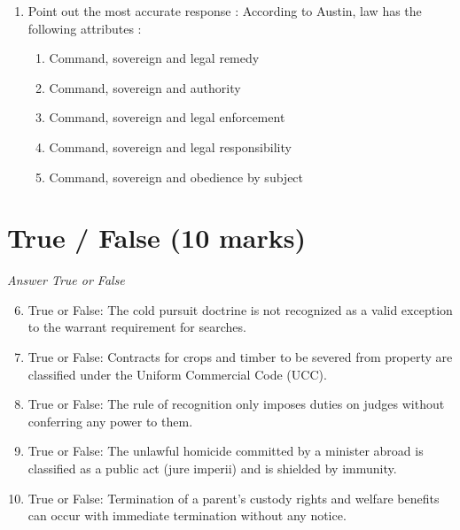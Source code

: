 \documentclass[12pt]{article}
\begin{document}
\begin{enumerate}[label=\arabic*.]
\begin{enumerate}[label=(\alph*)]
    \item The Nazi law in question was validly enacted.
    \item The Nazi rule of recognition was unclear.
    \item Hart agreed with Fuller's argument.
    \item The court misunderstood the legislation.
    \item Fuller misconstrued the purpose of the law.
\end{enumerate}
\item Point out the most accurate response : According to Austin, law has the following attributes :
\begin{enumerate}[label=(\alph*)]
    \item Command, sovereign and legal remedy
    \item Command, sovereign and authority
    \item Command, sovereign and legal enforcement
    \item Command, sovereign and legal responsibility
    \item Command, sovereign and obedience by subject
\end{enumerate}
\end{enumerate}

\section*{True / False (10 marks)}
\textit{Answer True or False}
\begin{enumerate}[label=\arabic*.]
\setcounter{enumi}{5}
\item True or False: The cold pursuit doctrine is not recognized as a valid exception to the warrant requirement for searches.
\item True or False: Contracts for crops and timber to be severed from property are classified under the Uniform Commercial Code (UCC).
\item True or False: The rule of recognition only imposes duties on judges without conferring any power to them.
\item True or False: The unlawful homicide committed by a minister abroad is classified as a public act (jure imperii) and is shielded by immunity.
\item True or False: Termination of a parent's custody rights and welfare benefits can occur with immediate termination without any notice.
\end{enumerate}
\end{document}
